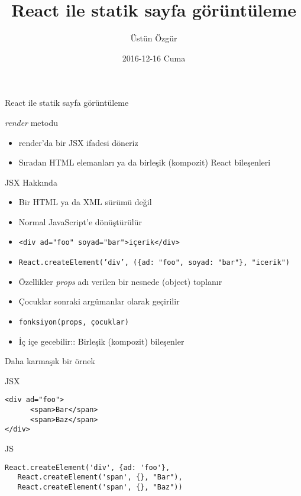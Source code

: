\documentclass[presentation]{beamer}
\author{Üstün Özgür}
\date{2016-12-16 Cuma}
\title{React ile statik sayfa görüntüleme}
\begin{document}
\maketitle

\begin{frame}[label={sec:org048d91b}]{React ile statik sayfa görüntüleme}
\begin{block}{\emph{render} metodu}
\begin{itemize}
\item render'da bir JSX ifadesi döneriz
\item Sıradan HTML elemanları ya da birleşik (kompozit) React bileşenleri
\end{itemize}
\end{block}
\end{frame}

\begin{frame}[fragile,label={sec:org57d96a0}]{JSX Hakkında}
 \begin{itemize}
\item Bir HTML ya da XML sürümü değil
\item Normal JavaScript'e dönüştürülür
\item \texttt{<div ad="foo" soyad="bar">içerik</div>}
\item \texttt{React.createElement('div', (\{ad: "foo", soyad: "bar"\}, "icerik")}
\item Özellikler \emph{props} adı verilen bir nesnede (object) toplanır
\item Çocuklar sonraki argümanlar olarak geçirilir
\item \texttt{fonksiyon(props, çocuklar)}
\item İç içe gecebilir:: Birleşik (kompozit) bileşenler
\end{itemize}
\end{frame}

\begin{frame}[fragile,label={sec:orgded6bab}]{Daha karmaşık bir örnek}
 \begin{block}{JSX}
\begin{verbatim}
<div ad="foo">
      <span>Bar</span>
      <span>Baz</span>
</div>
\end{verbatim}
\end{block}
\begin{block}{JS}
\begin{verbatim}
React.createElement('div', {ad: 'foo'},
   React.createElement('span', {}, "Bar"),
   React.createElement('span', {}, "Baz"))
\end{verbatim}
\end{block}
\end{frame}
\end{document}
